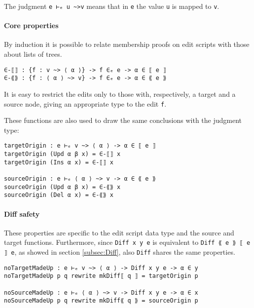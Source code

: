 \documentclass[../Thesis.tex]{subfiles}
\begin{document}
	The judgment \texttt{e ⊢ₑ u \textasciitilde>v} means that in \texttt{e} the 
	value \texttt{u} is mapped to \texttt{v}. 
	
	
	\paragraph{Core properties}
	By induction it is possible to relate membership proofs on edit scripts
	with those about lists of trees.
	
\begin{verbatim}
∈-⟦⟧ : {f : v ~> ⟨ α ⟩} -> f ∈ₑ e -> α ∈ ⟦ e ⟧ 
∈-⟪⟫ : {f : ⟨ α ⟩ ~> v} -> f ∈ₑ e -> α ∈ ⟪ e ⟫
\end{verbatim}

	It is easy to restrict the edits only to those with, respectively, a target and
	a source node, giving an appropriate type to the edit \texttt{f}.

	These functions are also used to draw the same conclusions with the 
	judgment type:
\begin{verbatim}
targetOrigin : e ⊢ₑ v ~> ⟨ α ⟩ -> α ∈ ⟦ e ⟧
targetOrigin (Upd α β x) = ∈-⟦⟧ x
targetOrigin (Ins α x) = ∈-⟦⟧ x

sourceOrigin : e ⊢ₑ ⟨ α ⟩ ~> v -> α ∈ ⟪ e ⟫
sourceOrigin (Upd α β x) = ∈-⟪⟫ x
sourceOrigin (Del α x) = ∈-⟪⟫ x
\end{verbatim}

	\paragraph{Diff safety}
	These properties are specific to the edit script data type and the source and 
	target functions.
	Furthermore, since \texttt{Diff x y e} is equivalent
	to \texttt{Diff ⟪ e ⟫ ⟦ e ⟧ e}, as showed in section \ref{subsec:Diff},
	also \texttt{Diff} shares the same properties.
	
\begin{verbatim}
noTargetMadeUp : e ⊢ₑ v ~> ⟨ α ⟩ -> Diff x y e -> α ∈ y 
noTargetMadeUp p q rewrite mkDiff⟦ q ⟧ = targetOrigin p

noSourceMadeUp : e ⊢ₑ ⟨ α ⟩ ~> v -> Diff x y e -> α ∈ x 
noSourceMadeUp p q rewrite mkDiff⟪ q ⟫ = sourceOrigin p
\end{verbatim}
\end{document}
